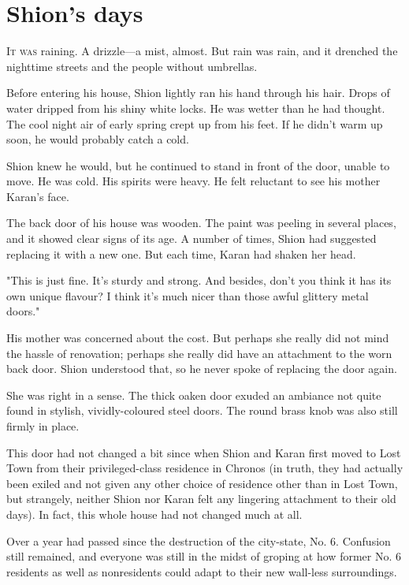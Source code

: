
\chapter{Shion's days}

\lettrine{I}{t was} raining. A drizzle---a mist, almost. But rain was rain, and it
drenched the nighttime streets and the people without umbrellas.

Before entering his house, Shion lightly ran his hand through his hair.
Drops of water dripped from his shiny white locks. He was wetter than he
had thought. The cool night air of early spring crept up from his feet.
If he didn't warm up soon, he would probably catch a cold.

Shion knew he would, but he continued to stand in front of the door,
unable to move. He was cold. His spirits were heavy. He felt reluctant
to see his mother Karan's face.

The back door of his house was wooden. The paint was peeling in several
places, and it showed clear signs of its age. A number of times, Shion
had suggested replacing it with a new one. But each time, Karan had
shaken her head.

"This is just fine. It's sturdy and strong. And besides, don't you think
it has its own unique flavour? I think it's much nicer than those awful
glittery metal doors."

His mother was concerned about the cost. But perhaps she really did not
mind the hassle of renovation; perhaps she really did have an attachment
to the worn back door. Shion understood that, so he never spoke of
replacing the door again.~

She was right in a sense. The thick oaken door exuded an ambiance not
quite found in stylish, vividly-coloured steel doors. The round brass
knob was also still firmly in place.

This door had not changed a bit since when Shion and Karan first moved
to Lost Town from their privileged-class residence in Chronos (in truth,
they had actually been exiled and not given any other choice of
residence other than in Lost Town, but strangely, neither Shion nor
Karan felt any lingering attachment to their old days). In fact, this
whole house had not changed much at all.

Over a year had passed since the destruction of the city-state, No. 6.
Confusion still remained, and everyone was still in the midst of groping
at how former No. 6 residents as well as nonresidents could adapt to
their new wall-less surroundings.

